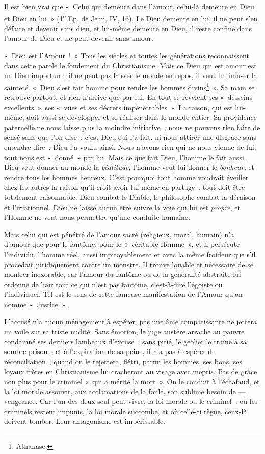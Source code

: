 \documentclass[french,twoside]{book} %
\begin{document}
Il est bien vrai que « Celui qui demeure dans l’amour, celui-là demeure en Dieu et Dieu en lui » (1\textsuperscript{e} Ep. de Jean, IV, 16). Le Dieu demeure en lui, il ne peut s’en défaire et devenir sans dieu, et lui-même demeure en Dieu, il reste confiné dans l’amour de Dieu et ne peut devenir sans amour.\par
« Dieu est l’Amour ! » Tous les siècles et toutes les générations reconnaissent dans cette parole le fondement du Christianisme. Mais ce Dieu qui est amour est un Dieu importun : il ne peut pas laisser le monde en repos, il veut lui infuser la sainteté. « Dieu s’est fait homme pour rendre les hommes divins\footnote{ \noindent Athanase.
 } ». Sa main se retrouve partout, et rien n’arrive que par lui. En tout se révèlent ses « desseins excellents », ses « vues et ses décrets impénétrables ». La raison, qui est lui-même, doit aussi se développer et se réaliser  dans le monde entier. Sa providence paternelle ne nous laisse plus la moindre initiative ; nous ne pouvons rien faire de sensé sans que l’on dise : c’est Dieu qui l’a fait, ni nous attirer une disgrâce sans entendre dire : Dieu l’a voulu ainsi. Nous n’avons rien qui ne nous vienne de lui, tout nous est « donné » par lui. Mais ce que fait Dieu, l’homme le fait aussi. Dieu veut donner au monde la \emph{béatitude}, l’homme veut lui donner le \emph{bonheur,} et rendre tous les hommes heureux. C’est pourquoi tout homme voudrait éveiller chez les autres la raison qu’il croit avoir lui-même en partage : tout doit être totalement raisonnable. Dieu combat le Diable, le philosophe combat la déraison et l’irrationnel. Dieu ne laisse aucun être suivre la voie qui lui est \emph{propre}, et l’Homme ne veut nous permettre qu’une conduite humaine.\par
Mais celui qui est pénétré de l’amour sacré (religieux, moral, humain) n’a d’amour que pour le fantôme, pour le « véritable Homme », et il persécute l’individu, l’homme réel, aussi impitoyablement et avec la même froideur que s’il procédait juridiquement contre un monstre. Il trouve louable et nécessaire de se montrer inexorable, car l’amour du fantôme ou de la généralité abstraite lui ordonne de haïr tout ce qui n’est pas fantôme, c’est-à-dire l’égoïste ou l’individuel. Tel est le sens de cette fameuse manifestation de l’Amour qu’on nomme « Justice ».\par
L’accusé n’a aucun ménagement à espérer, pas une âme compatissante ne jettera un voile sur sa triste nudité. Sans émotion, le juge austère arrache au pauvre condamné ses derniers lambeaux d’excuse ; sans pitié, le geôlier le traîne à sa sombre prison ; et à l’expiration de sa peine, il n’a pas à espérer de réconciliation ; quand on le rejettera, flétri, parmi les hommes, ses bons, ses loyaux frères en Christianisme lui cracheront au visage avec mépris. Pas de grâce non plus pour le criminel « qui a mérité la mort ». On le conduit à l’échafaud, et la loi morale assouvit,  aux acclamations de la foule, son sublime besoin de — vengeance. Car l’un des deux seul peut vivre, la loi morale ou le criminel : où les criminels restent impunis, la loi morale succombe, et où celle-ci règne, ceux-là doivent tomber. Leur antagonisme est impérissable.\par
\end{document}
